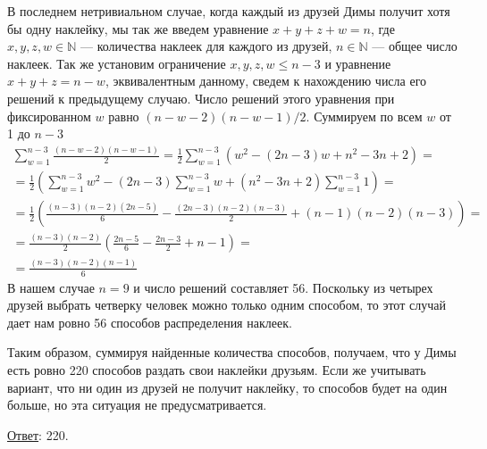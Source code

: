 \documentclass[12pt]{article}
\begin{document}
    В последнем нетривиальном случае, когда каждый из друзей Димы получит хотя бы одну наклейку, мы так же введем уравнение $x + y + z + w = n$, где $x, y, z, w \in \mathbb{N}$ — количества наклеек для каждого из друзей, $n \in \mathbb{N}$ — общее число наклеек. Так же установим ограничение $x, y, z, w \leqslant n - 3$ и уравнение $x + y + z = n - w$, эквивалентным данному, сведем к нахождению числа его решений к предыдущему случаю. Число решений этого уравнения при фиксированном $w$ равно $(n-w-2)(n-w-1)/2$. Суммируем по всем $w$ от 1 до $n - 3$
    \begin{equation*}
    \begin{aligned}
        \sum_{w=1}^{n-3}\frac{(n-w-2)(n-w-1)}{2} = \frac{1}{2}\sum_{w=1}^{n-3}(w^2 - (2n-3)w + n^2 - 3n + 2) = \\
        = \frac{1}{2}\left(\sum_{w=1}^{n-3}w^2 - (2n-3)\sum_{w=1}^{n-3}w + (n^2 - 3n + 2)\sum_{w=1}^{n-3}1\right) = \\
        = \frac{1}{2}\left(\frac{(n-3)(n-2)(2n-5)}{6} - \frac{(2n-3)(n-2)(n-3)}{2} + (n-1)(n-2)(n-3)\right) = \\
        = \frac{(n-3)(n-2)}{2}\left(\frac{2n-5}{6} - \frac{2n-3}{2} + n-1\right) = \\
        = \frac{(n - 3)(n - 2)(n - 1)}{6}
    \end{aligned}
    \end{equation*}
    В нашем случае $n = 9$ и число решений составляет 56. Поскольку из четырех друзей выбрать четверку человек можно только одним способом, то этот случай дает нам ровно 56 способов распределения наклеек.

    Таким образом, суммируя найденные количества способов, получаем, что у Димы есть ровно 220 способов раздать свои наклейки друзьям. Если же учитывать вариант, что ни один из друзей не получит наклейку, то способов будет на один больше, но эта ситуация не предусматривается.

    \underline{Ответ}: 220.
\end{document}
